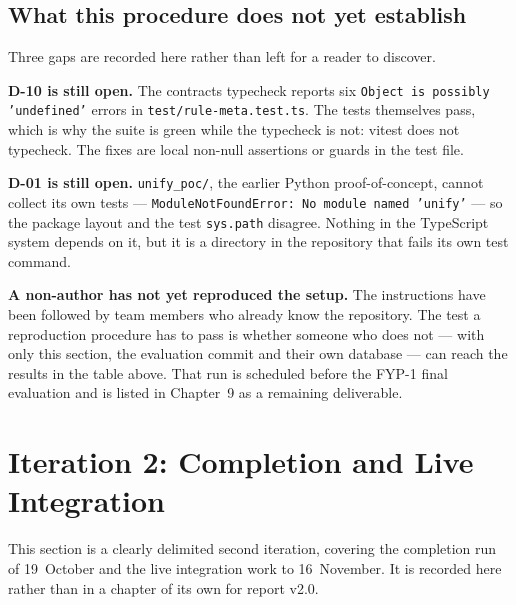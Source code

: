 \subsection{What this procedure does not yet establish}

Three gaps are recorded here rather than left for a reader to discover.

\textbf{D-10 is still open.} The contracts typecheck reports six
\texttt{Object is possibly 'undefined'} errors in
\texttt{test/rule-meta.test.ts}. The tests themselves pass, which is why the
suite is green while the typecheck is not: vitest does not typecheck. The
fixes are local non-null assertions or guards in the test file.

\textbf{D-01 is still open.} \texttt{unify\_poc/}, the earlier Python
proof-of-concept, cannot collect its own tests --- \texttt{ModuleNotFoundError:
No module named 'unify'} --- so the package layout and the test
\texttt{sys.path} disagree. Nothing in the TypeScript system depends on it,
but it is a directory in the repository that fails its own test command.

\textbf{A non-author has not yet reproduced the setup.} The instructions have
been followed by team members who already know the repository. The test a
reproduction procedure has to pass is whether someone who does not --- with
only this section, the evaluation commit and their own database --- can reach
the results in the table above. That run is scheduled before the FYP-1 final
evaluation and is listed in Chapter~9 as a remaining deliverable.

\section{Iteration 2: Completion and Live Integration}
\label{sec:ch6-iter2}

This section is a clearly delimited second iteration, covering the completion
run of 19~October and the live integration work to 16~November. It is
recorded here rather than in a chapter of its own for report v2.0.

